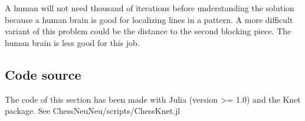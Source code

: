 \documentclass[a4paper,10pt]{article}
\begin{document}
A human will not need thousand of iterations before understanding the solution
because a human brain is good for localizing lines in a pattern. A more
difficult variant of this problem could be the distance to the second blocking
piece. The human brain is less good for this job.

\subsection{Code source}

The code of this section has been made with Julia (version >= 1.0) and the
Knet package. See ChessNeuNeu/scripts/ChessKnet.jl
\end{document}
